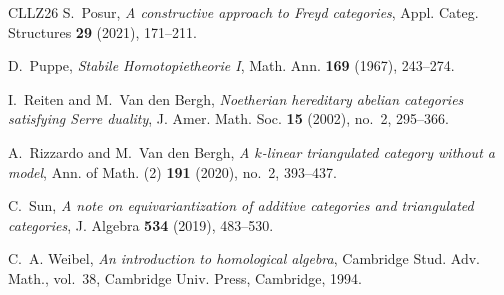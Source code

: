 \documentclass[a4paper,11pt,reqno]{amsart}
\theoremstyle{definition}
\theoremstyle{plain}
\numberwithin{equation}{section}
\begin{document}
\begin{thebibliography}{CLLZ26}
S.~Posur,
\emph{A constructive approach to Freyd categories},
Appl. Categ. Structures \textbf{29} (2021), 171--211.

D.~Puppe,
\emph{Stabile Homotopietheorie I},
Math. Ann. \textbf{169} (1967), 243--274.

I.~Reiten and M.~Van den Bergh,
\emph{Noetherian hereditary abelian categories satisfying Serre duality},
J. Amer. Math. Soc. \textbf{15} (2002), no.~2, 295--366.

A.~Rizzardo and M.~Van den Bergh,
\emph{A \(k\)-linear triangulated category without a model},
Ann. of Math. (2) \textbf{191} (2020), no.~2, 393--437.

C.~Sun,
\emph{A note on equivariantization of additive categories and triangulated
categories},
J. Algebra \textbf{534} (2019), 483--530.

C.~A. Weibel,
\emph{An introduction to homological algebra},
Cambridge Stud. Adv. Math., vol.~38,
Cambridge Univ. Press, Cambridge, 1994.
\end{thebibliography}
\end{document}
